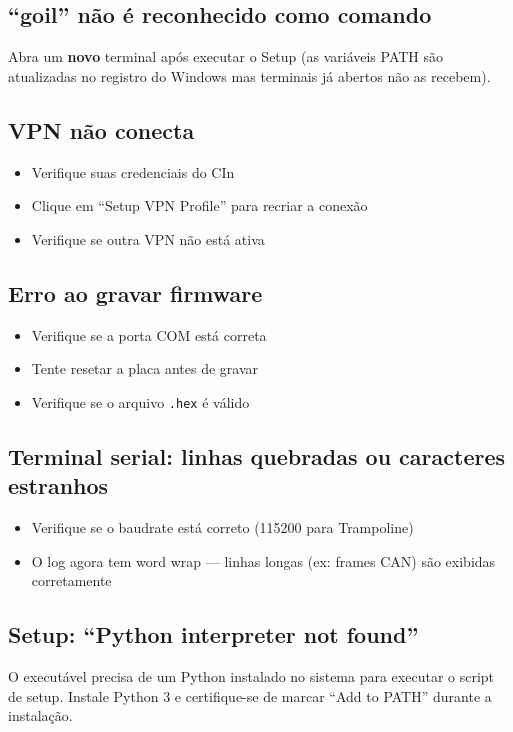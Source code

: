 \documentclass[12pt,a4paper]{article}
\begin{document}
\subsection{``goil'' não é reconhecido como comando}
Abra um \textbf{novo} terminal após executar o Setup (as variáveis PATH são atualizadas no registro do Windows mas terminais já abertos não as recebem).

\subsection{VPN não conecta}
\begin{itemize}[nosep]
  \item Verifique suas credenciais do CIn
  \item Clique em ``Setup VPN Profile'' para recriar a conexão
  \item Verifique se outra VPN não está ativa
\end{itemize}

\subsection{Erro ao gravar firmware}
\begin{itemize}[nosep]
  \item Verifique se a porta COM está correta
  \item Tente resetar a placa antes de gravar
  \item Verifique se o arquivo \texttt{.hex} é válido
\end{itemize}

\subsection{Terminal serial: linhas quebradas ou caracteres estranhos}
\begin{itemize}[nosep]
  \item Verifique se o baudrate está correto (115200 para Trampoline)
  \item O log agora tem word wrap --- linhas longas (ex: frames CAN) são exibidas corretamente
\end{itemize}

\subsection{Setup: ``Python interpreter not found''}
O executável precisa de um Python instalado no sistema para executar o script de setup. Instale Python 3 e certifique-se de marcar ``Add to PATH'' durante a instalação.
\end{document}
